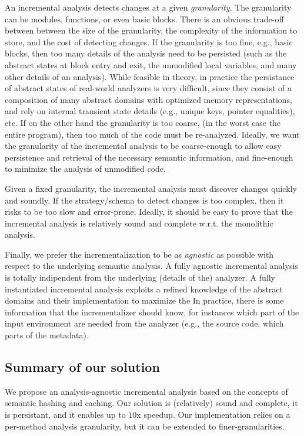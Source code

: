 \documentclass{llncs}
\begin{document}
An incremental analysis detects changes at a given \emph{granularity}. 
The granularity can be modules, functions, or even basic blocks.
There is an obvious trade-off between between the size of the granularity, the complexity of the information to store, and the cost of detecting changes.
If the granularity is too fine, e.g., basic blocks, then too many details of the analysis need to be persisted (such as the abstract states at block entry and exit, the unmodified local variables, and many other details of an analysis).
While feasible in theory, in practice the persistance of abstract states of real-world analyzers is very difficult, since they consist of a composition of many abstract domains with optimized memory representations, and rely on internal transient state details (e.g., unique keys, pointer equalities), etc.
If on the other hand the granularity is too coarse, (in the worst case the entire program), then too much of the code must be re-analyzed.
Ideally, we want the granularity of the incremental analysis  to be coarse-enough to allow easy persistence and retrieval of the necessary semantic information, and fine-enough to minimize the analysis of unmodified code.

Given a fixed granularity, the incremental analysis must discover changes quickly and soundly.
If the strategy/schema to detect  changes is too complex, then it risks to be too slow and  error-prone.
Ideally, it should be easy to prove that the incremental analysis is relatively sound and complete w.r.t. the monolithic analysis.

Finally, we prefer the incrementalization to be as \emph{agnostic} as possible with respect to the underlying semantic analysis.
A fully agnostic incremental analysis is totally indipendent from the underlying (details of the) analyzer.
A fully instantiated incremental analysis exploits a refined knowledge of the abstract domains and their implementation to maximize the  
In practice, there is some information that the incrementalizer should know, for instances which part of the input environment are needed from the analyzer (e.g., the source code, which parts of the metadata).

\subsection{Summary of our solution}
We propose an analysis-agnostic incremental analysis based on the concepts of semantic hashing and caching.
Our solution is (relatively) sound and complete, it is persistant, and it enables up to $10$x speedup.
Our implementation relies on a per-method analysis granularity, but it can be extended to finer-granularities.
\end{document}

